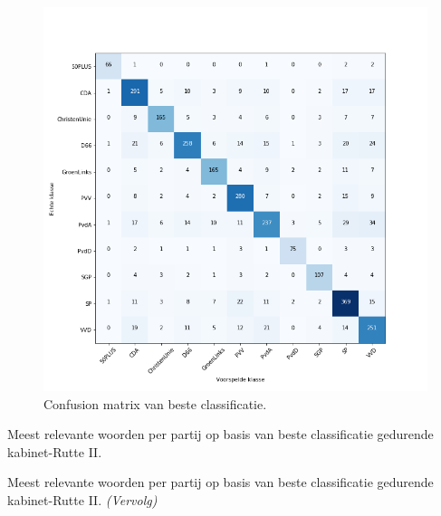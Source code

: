 \begin{figure}[H]
  \centering
    \includegraphics[width=0.60\paperwidth]{Verslag/Tables/confusionmatrix.png}
\caption{Confusion matrix van beste classificatie.}
\label{fig:confusionmatrix}
\end{figure}



\begin{table}[H]
\caption{Meest relevante woorden per partij op basis van beste classificatie gedurende kabinet-Rutte II.} 

\label{tab:MostImportantWords} 
\centering
\hspace*{-1in}
 
\end{table} 
\addtocounter{table}{-1} 
\begin{table}[H]
\caption{Meest relevante woorden per partij op basis van beste classificatie gedurende kabinet-Rutte II. \emph{(Vervolg)}} 
\centering
\hspace*{-1in}
 
\end{table}

